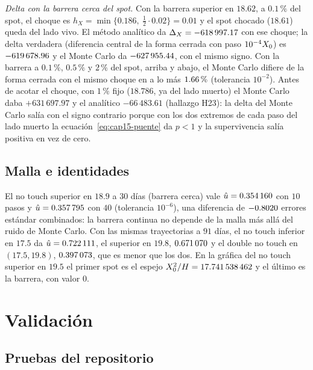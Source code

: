 \emph{Delta con la barrera cerca del spot.} Con la barrera superior en $18.62$, a $0.1\,\%$ del spot, el choque es $h_X=\min\{0.186,\ \tfrac12\cdot0.02\}=0.01$ y el spot
chocado ($18.61$) queda del lado vivo. El método analítico da $\Delta_X=\verif{cap15-delta-cerca-an}{-618997.17}$ con ese choque; la delta
verdadera (diferencia central de la forma cerrada con paso $10^{-4}\Spot$) es $\verif{cap15-delta-cerca-real}{-619678.96}$ y el Monte Carlo
da $\verif{cap15-delta-cerca-mc}{-627955.44}$, con el mismo signo. Con la barrera a $0.1\,\%$, $0.5\,\%$ y $2\,\%$ del spot, arriba y abajo, el Monte Carlo difiere de la forma
cerrada con el mismo choque en a lo más $\verif{cap15-delta-cerca-dif-max}{1.66}\,\%$ (tolerancia $10^{-2}$). Antes de acotar el choque, con $1\,\%$ fijo
($18.786$, ya del lado muerto) el Monte Carlo daba $+631\,697.97$ y el analítico $-66\,483.61$ (hallazgo H23): la delta del Monte Carlo salía con el signo
contrario porque con los dos extremos de cada paso del lado muerto la ecuación~\eqref{eq:cap15-puente} da $p<1$ y la supervivencia salía positiva en vez de cero.

\subsection{Malla e identidades}\label{sec:cap15-ej-malla}

El no touch superior en $18.9$ a $30$ días (barrera cerca) vale $\hat u=\verif{cap15-malla-u10}{0.354160}$ con $10$ pasos y
$\hat u=\verif{cap15-malla-u40}{0.357795}$ con $40$ (tolerancia $10^{-6}$), una diferencia de
$\verif{cap15-malla-dif-se}{-0.8020}$ errores estándar combinados: la barrera continua no depende de la malla más allá del ruido de Monte Carlo. Con las
mismas trayectorias a $91$ días, el no touch inferior en $17.5$ da $\hat u=\verif{cap15-id-abajo}{0.722111}$, el superior en $19.8$,
$\verif{cap15-id-arriba}{0.671070}$ y el double no touch en $(17.5,19.8)$, $\verif{cap15-id-doble}{0.397073}$, que es menor que los dos. En la gráfica
del no touch superior en $19.5$ el primer spot es el espejo $\Spot^2/H=\verif{cap15-grafica-x0}{17.741538462}$ y el último es la barrera, con valor $0$.

\section{Validación}\label{sec:cap15-validacion}

\subsection{Pruebas del repositorio}\label{sec:cap15-pruebas}

